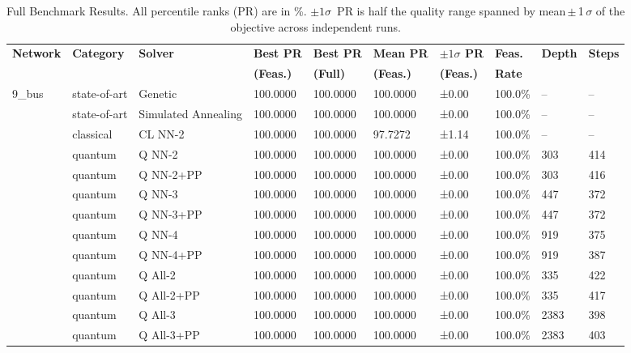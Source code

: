 \begin{table}[ht]
\centering
\caption{Full Benchmark Results. All percentile ranks (PR) are in \%. $\pm1\sigma$~PR is half the quality range spanned by mean\,$\pm$\,1\,$\sigma$ of the objective across independent runs.}
\label{tab:benchmark}
\small
\begin{tabular}{llllllllll}
\toprule
\textbf{Network} & \textbf{Category} & \textbf{Solver} & \textbf{Best PR} & \textbf{Best PR} & \textbf{Mean PR} & \textbf{$\pm1\sigma$ PR} & \textbf{Feas.} & \textbf{Depth} & \textbf{Steps} \\
 & & & \textbf{(Feas.)} & \textbf{(Full)} & \textbf{(Feas.)} & \textbf{(Feas.)} & \textbf{Rate} & & \\
\midrule
\rowcolor{blue!10}
9\_bus & state-of-art & Genetic & 100.0000 & 100.0000 & 100.0000 & ±0.00 & 100.0\% & – & – \\
\rowcolor{blue!10}
 & state-of-art & Simulated Annealing & 100.0000 & 100.0000 & 100.0000 & ±0.00 & 100.0\% & – & – \\
\rowcolor{green!10}
 & classical & CL NN-2 & 100.0000 & 100.0000 & 97.7272 & ±1.14 & 100.0\% & – & – \\
\rowcolor{orange!12}
 & quantum & Q NN-2 & 100.0000 & 100.0000 & 100.0000 & ±0.00 & 100.0\% & 303 & 414 \\
\rowcolor{orange!12}
 & quantum & Q NN-2+PP & 100.0000 & 100.0000 & 100.0000 & ±0.00 & 100.0\% & 303 & 416 \\
\rowcolor{orange!12}
 & quantum & Q NN-3 & 100.0000 & 100.0000 & 100.0000 & ±0.00 & 100.0\% & 447 & 372 \\
\rowcolor{orange!12}
 & quantum & Q NN-3+PP & 100.0000 & 100.0000 & 100.0000 & ±0.00 & 100.0\% & 447 & 372 \\
\rowcolor{orange!12}
 & quantum & Q NN-4 & 100.0000 & 100.0000 & 100.0000 & ±0.00 & 100.0\% & 919 & 375 \\
\rowcolor{orange!12}
 & quantum & Q NN-4+PP & 100.0000 & 100.0000 & 100.0000 & ±0.00 & 100.0\% & 919 & 387 \\
\rowcolor{orange!12}
 & quantum & Q All-2 & 100.0000 & 100.0000 & 100.0000 & ±0.00 & 100.0\% & 335 & 422 \\
\rowcolor{orange!12}
 & quantum & Q All-2+PP & 100.0000 & 100.0000 & 100.0000 & ±0.00 & 100.0\% & 335 & 417 \\
\rowcolor{orange!12}
 & quantum & Q All-3 & 100.0000 & 100.0000 & 100.0000 & ±0.00 & 100.0\% & 2383 & 398 \\
\rowcolor{orange!12}
 & quantum & Q All-3+PP & 100.0000 & 100.0000 & 100.0000 & ±0.00 & 100.0\% & 2383 & 403 \\

\end{tabular}
\end{table}
